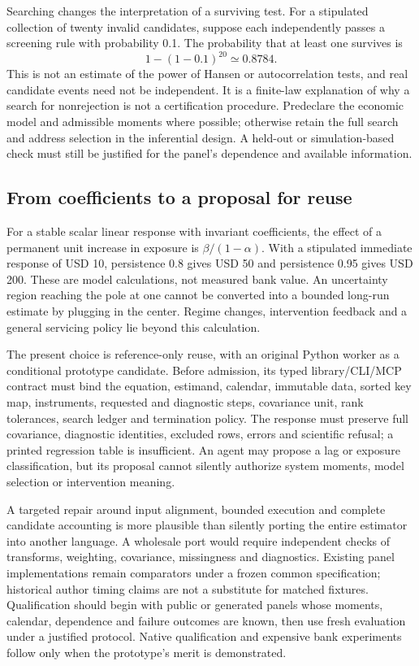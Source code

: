 Searching changes the interpretation of a surviving test. For a stipulated collection
of twenty invalid candidates, suppose each independently passes a screening rule with
probability 0.1. The probability that at least one survives is
\begin{equation}
 1-(1-0.1)^{20}\simeq0.8784.
\end{equation}
This is not an estimate of the power of Hansen or autocorrelation tests, and real
candidate events need not be independent. It is a finite-law explanation of why a
search for nonrejection is not a certification procedure. Predeclare the economic
model and admissible moments where possible; otherwise retain the full search and
address selection in the inferential design. A held-out or simulation-based check
must still be justified for the panel's dependence and available information.
\citep{exec24_pydynpd_reference}

\subsection{From coefficients to a proposal for reuse}
For a stable scalar linear response with invariant coefficients, the effect of a
permanent unit increase in exposure is $\beta/(1-\alpha)$. With a stipulated immediate
response of USD 10, persistence 0.8 gives USD 50 and persistence 0.95 gives USD 200.
These are model calculations, not measured bank value. An uncertainty region reaching
the pole at one cannot be converted into a bounded long-run estimate by plugging in
the center. Regime changes, intervention feedback and a general servicing policy lie
beyond this calculation.~\citep{exec24_pydynpd_reference}

The present choice is reference-only reuse, with an original Python worker as a
conditional prototype candidate. Before admission, its typed library/CLI/MCP contract
must bind the equation, estimand, calendar, immutable data, sorted key map, instruments,
requested and diagnostic steps, covariance unit, rank tolerances, search ledger and
termination policy. The response must preserve full covariance, diagnostic identities,
excluded rows, errors and scientific refusal; a printed regression table is insufficient.
An agent may propose a lag or exposure classification, but its proposal cannot silently
authorize system moments, model selection or intervention meaning.

A targeted repair around input alignment, bounded execution and complete candidate
accounting is more plausible than silently porting the entire estimator into another
language. A wholesale port would require independent checks of transforms, weighting,
covariance, missingness and diagnostics. Existing panel implementations remain comparators
under a frozen common specification; historical author timing claims are not a substitute
for matched fixtures. Qualification should begin with public or generated panels whose
moments, calendar, dependence and failure outcomes are known, then use fresh evaluation
under a justified protocol. Native qualification and expensive bank experiments follow
only when the prototype's merit is demonstrated.

